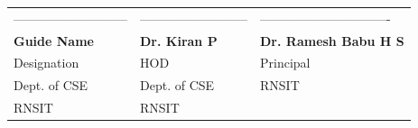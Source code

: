 \vspace{3 cm}
\begin{center}
	\begin{table}[ht]
		\centering
		\begin{tabular}{p{5.5cm} p{5.5cm} p{5.5cm} }
			--------------------------- & -------------------------- & -------------------------------\\
			\textbf{Guide Name} & \textbf{Dr. Kiran P}  & \textbf{Dr. Ramesh Babu H S}\\
			Designation & HOD & Principal \\ 
			Dept. of CSE  & Dept. of CSE & RNSIT\\ 
			RNSIT & RNSIT
		\end{tabular}
		
	\end{table} 
	
\end{center}



\thispagestyle{empty}




